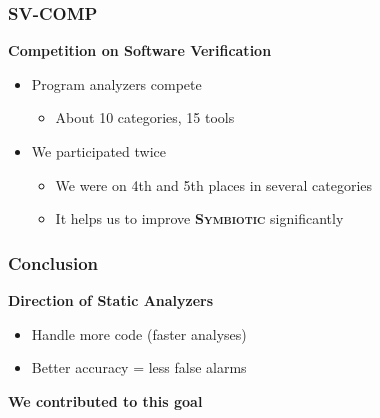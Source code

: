 \documentclass[xcolor=dvipsnames]{beamer}
\newcommand{\heading}[1]{\textbf{\textcolor{BurntOrange}{#1}}}
\newcommand{\symb}{\textbf{\textsc{Symbiotic}}\xspace}
\begin{document}
\begin{frame}
  \frametitle{SV-COMP}

  \heading{Competition on Software Verification}
  \begin{itemize}
    \item Program analyzers compete
    \begin{itemize}
      \item About 10 categories, 15 tools
    \end{itemize}

    \pause

    \item We participated twice
    \begin{itemize}
      \item We were on 4th and 5th places in several categories
      \item It helps us to improve \symb significantly
    \end{itemize}
  \end{itemize}

\end{frame}

\begin{frame}
  \frametitle{Conclusion}

  \heading{Direction of Static Analyzers}
  \begin{itemize}
    \item Handle more code (faster analyses)
    \item Better accuracy = less false alarms
  \end{itemize}

  \bigskip
  \bigskip

  \begin{center}
    \large
    \heading{We contributed to this goal}
  \end{center}

\end{frame}
\end{document}
